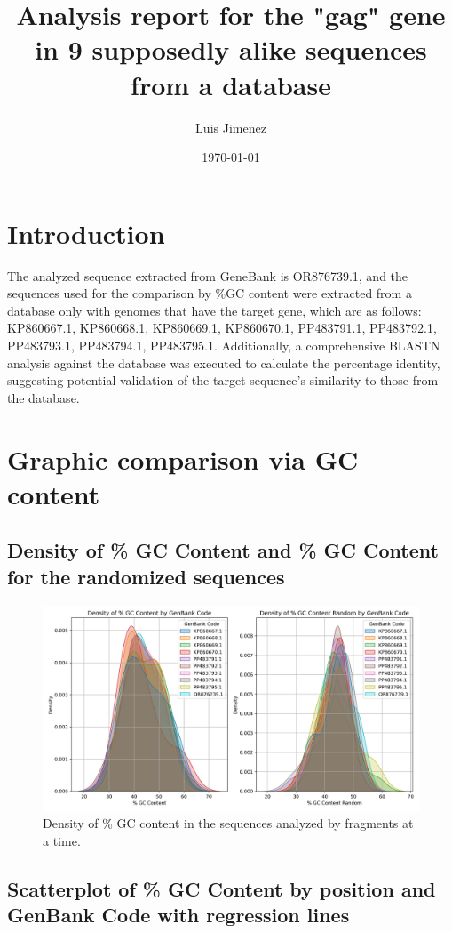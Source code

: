 \documentclass{article}%
\title{Analysis report for the "gag" gene in 9 supposedly alike sequences from a database}%
\author{Luis Jimenez}%
\date{\today}%
\begin{document}
%
\normalsize%
\maketitle%
\section{Introduction}%
\label{sec:Introduction}%
The analyzed sequence extracted from GeneBank is OR876739.1, and the sequences used for the comparison by \%GC content were extracted from a database only with genomes that have the target gene, which are as follows: KP860667.1, KP860668.1, KP860669.1, KP860670.1, PP483791.1, PP483792.1, PP483793.1, PP483794.1, PP483795.1. Additionally, a comprehensive BLASTN analysis against the database was executed to calculate the percentage identity, suggesting potential validation of the target sequence's similarity to those from the database.

%
\section{Graphic comparison via GC content}%
\label{sec:GraphiccomparisonviaGCcontent}%
\subsection{Density of \% GC Content and \% GC Content for the randomized sequences}%
\label{subsec:DensityofGCContentandGCContentfortherandomizedsequences}%


\begin{figure}[!htbp]%
\centering%
\includegraphics[width=1\textwidth]{density_gc.jpg}%
\caption{Density of \% GC content in the sequences analyzed by fragments at a time.}%
\end{figure}

%
\subsection{Scatterplot of \% GC Content by position and GenBank Code with regression lines}%
\label{subsec:ScatterplotofGCContentbypositionandGenBankCodewithregressionlines}%
\end{document}
